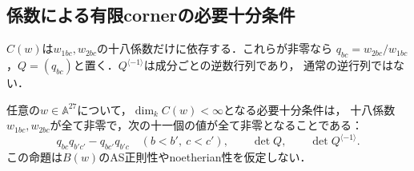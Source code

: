 \subsection{係数による有限cornerの必要十分条件}
$C(w)$は$w_{1bc},w_{2bc}$の十八係数だけに依存する．これらが非零なら
$q_{bc}=w_{2bc}/w_{1bc}$，$Q=(q_{bc})$と置く．$Q^{\langle-1\rangle}$は成分ごとの逆数行列であり，
通常の逆行列ではない．

\begin{theorem}[十一条件による判定]\label{thm:eleven}
任意の$w\in\mathbb A^{27}$について，$\dim_k C(w)<\infty$となる必要十分条件は，
十八係数$w_{1bc},w_{2bc}$が全て非零で，次の十一個の値が全て非零となることである：
\begin{equation}\label{eq:elevenconditions}
 q_{bc}q_{b'c'}-q_{bc'}q_{b'c}\quad(b<b',\ c<c'),\qquad
 \det Q,\qquad \det Q^{\langle-1\rangle}.
\end{equation}
この命題は$B(w)$のAS正則性やnoetherian性を仮定しない．
\end{theorem}
